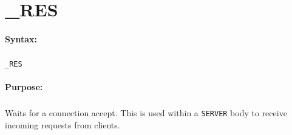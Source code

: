 
\newpage
\section{\_RES}
\label{cmd:_RES}

\paragraph{Syntax:}
\subparagraph{}
\texttt{\_RES}

\paragraph{Purpose:}
\subparagraph{}
Waits for a connection accept. This is used within 
a \texttt{SERVER} body to receive incoming requests 
from clients.